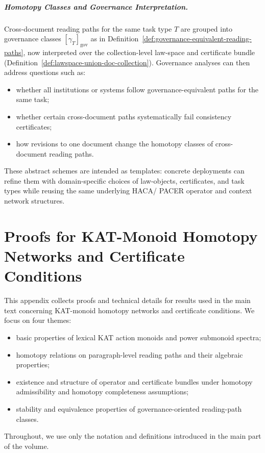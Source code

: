 \documentclass[11pt]{book}
\theoremstyle{plain}
\theoremstyle{definition}
\theoremstyle{remark}
\begin{document}
\paragraph{Homotopy Classes and Governance Interpretation.}
Cross-document reading paths for the same task type $T$ are grouped
into governance classes $[\gamma_T]_{\mathrm{gov}}$ as in
Definition~\ref{def:governance-equivalent-reading-paths}, now
interpreted over the collection-level law-space and certificate bundle
(Definition~\ref{def:lawspace-union-doc-collection}). Governance
analyses can then address questions such as:
\begin{itemize}
  \item whether all institutions or systems follow governance-equivalent
        paths for the same task;
  \item whether certain cross-document paths systematically fail
        consistency certificates;
  \item how revisions to one document change the homotopy classes of
        cross-document reading paths.
\end{itemize}
These abstract schemes are intended as templates: concrete deployments
can refine them with domain-specific choices of law-objects,
certificates, and task types while reusing the same underlying HACA/
PACER operator and context network structures.



\chapter{Proofs for KAT-Monoid Homotopy Networks and Certificate Conditions}


This appendix collects proofs and technical details for results used
in the main text concerning KAT-monoid homotopy networks and certificate
conditions. We focus on four themes:
\begin{itemize}
  \item basic properties of lexical KAT action monoids and power
        submonoid spectra;
  \item homotopy relations on paragraph-level reading paths and their
        algebraic properties;
  \item existence and structure of operator and certificate bundles
        under homotopy admissibility and homotopy completeness
        assumptions;
  \item stability and equivalence properties of governance-oriented
        reading-path classes.
\end{itemize}
Throughout, we use only the notation and definitions introduced in the
main part of the volume.
\end{document}
